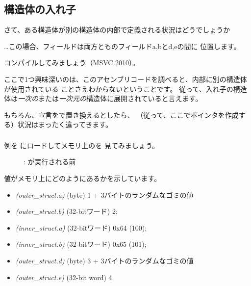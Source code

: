 \subsection{構造体の入れ子}

さて、ある構造体が別の構造体の内部で定義される状況はどうでしょうか



\dots この場合、フィールドは両方とものフィールドa,bとd,eの間に
位置します。

コンパイルしてみましょう（MSVC 2010）。



ここで1つ興味深いのは、このアセンブリコードを調べると、内部に別の構造体が使用されている
ことさえわからないということです。
従って、入れ子の構造体は\emph{一次の}または\emph{一次元の}構造体に展開されていると言えます。

もちろん、宣言をで置き換えるとしたら、
（従って、ここでポインタを作成する）状況はまったく違ってきます。

\clearpage
\subsubsection{\olly}
\myindex{\olly}

例を \olly にロードしてメモリ上のを
見てみましょう。

\begin{figure}[H]
\centering
{}
\caption{\olly: \printf が実行される前}
\label{fig:nested_olly}
\end{figure}

値がメモリ上にどのようにあるかを示しています。
\begin{itemize}
\item \emph{(outer\_struct.a)} (byte) 1 + 3バイトのランダムなゴミの値
\item \emph{(outer\_struct.b)} (32-bitワード) 2;
\item \emph{(inner\_struct.a)} (32-bitワード) 0x64 (100);
\item \emph{(inner\_struct.b)} (32-bitワード) 0x65 (101);
\item \emph{(outer\_struct.d)} (byte) 3 + 3バイトのランダムなゴミの値
\item \emph{(outer\_struct.e)} (32-bit word) 4.
\end{itemize}

